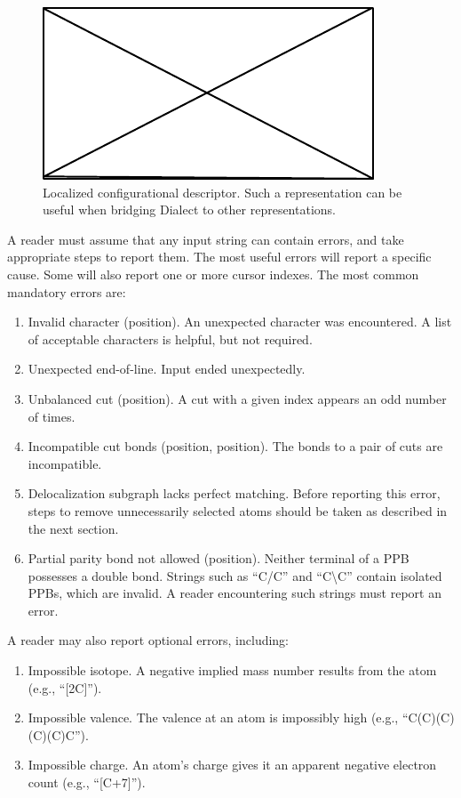 \documentclass{article}
\begin{document}
\begin{figure}
    \centering
    \includegraphics{filler}
    \caption{Localized configurational descriptor. Such a representation can be useful when bridging Dialect to other representations.}
    \label{fig:localized-configurational-descriptor}
\end{figure}

A reader must assume that any input string can contain errors, and take appropriate steps to report them. The most useful errors will report a specific cause. Some will also report one or more cursor indexes. The most common mandatory errors are:

\begin{enumerate}
    \item{Invalid character (position). An unexpected character was encountered. A list of acceptable characters is helpful, but not required.}
    \item{Unexpected end-of-line. Input ended unexpectedly.}
    \item{Unbalanced cut (position). A cut with a given index appears an odd number of times.}
    \item{Incompatible cut bonds (position, position). The bonds to a pair of cuts are incompatible.}
    \item{Delocalization subgraph lacks perfect matching. Before reporting this error, steps to remove unnecessarily selected atoms should be taken as described in the next section.}
    \item{Partial parity bond not allowed (position). Neither terminal of a PPB possesses a double bond. Strings such as \enquote{C/C} and \enquote{C{\textbackslash}C} contain isolated PPBs, which are invalid. A reader encountering such strings must report an error.}
\end{enumerate}

A reader may also report optional errors, including:

\begin{enumerate}
    \item{Impossible isotope. A negative implied mass number results from the atom (e.g., \enquote{[2C]}).}
    \item{Impossible valence. The valence at an atom is impossibly high (e.g., \enquote{C(C)(C)(C)(C)C}).}
    \item{Impossible charge. An atom's charge gives it an apparent negative electron count (e.g., \enquote{[C+7]}).}
\end{enumerate}
\end{document}
